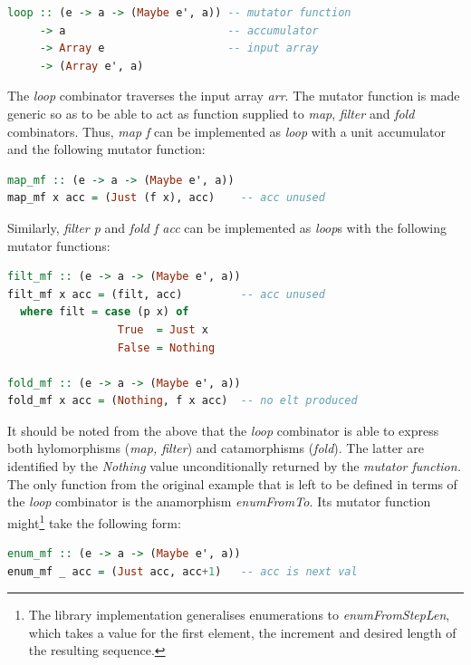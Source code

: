 \documentclass[preamble.tex]{subfiles}
\begin{document}
\begin{lstlisting}[basicstyle={\ttfamily},language=Haskell]
loop :: (e -> a -> (Maybe e', a)) -- mutator function
     -> a                         -- accumulator
     -> Array e                   -- input array
     -> (Array e', a)
\end{lstlisting}


The \emph{loop} combinator traverses the input array \emph{arr}. The mutator function is made generic so as to be able to act as function supplied to \emph{map}, \emph{filter} and \emph{fold} combinators. Thus, \emph{map f} can be implemented as \emph{loop} with a unit accumulator and the following mutator function:

\begin{lstlisting}[basicstyle={\ttfamily},language=Haskell]
map_mf :: (e -> a -> (Maybe e', a))
map_mf x acc = (Just (f x), acc)    -- acc unused
\end{lstlisting}


Similarly, \emph{filter p} and \emph{fold f acc} can be implemented as \emph{loop}s with the following mutator functions:

\begin{lstlisting}[basicstyle={\ttfamily},language=Haskell]
filt_mf :: (e -> a -> (Maybe e', a))
filt_mf x acc = (filt, acc)         -- acc unused
  where filt = case (p x) of
                 True  = Just x
                 False = Nothing

fold_mf :: (e -> a -> (Maybe e', a))
fold_mf x acc = (Nothing, f x acc)  -- no elt produced
\end{lstlisting}


It should be noted from the above that the \emph{loop} combinator is able to express both hylomorphisms (\emph{map, filter}) and catamorphisms (\emph{fold}). The latter are identified by the \emph{Nothing} value unconditionally returned by the \emph{mutator function.} The only function from the original example that is left to be defined in terms of the \emph{loop} combinator is the anamorphism \emph{enumFromTo.} Its mutator function might\footnote{The library implementation generalises enumerations to \emph{enumFromStepLen}, which takes a value for the first element, the increment and desired length of the resulting sequence. } take the following form:

\begin{lstlisting}[basicstyle={\ttfamily},language=Haskell]
enum_mf :: (e -> a -> (Maybe e', a))
enum_mf _ acc = (Just acc, acc+1)   -- acc is next val
\end{lstlisting}
\end{document}
